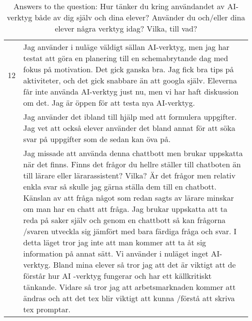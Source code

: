 \begin{table}[h]
{\begin{tabularx}{\textwidth}{@{}lX@{}}
12 & Jag använder i nuläge väldigt sällan AI-verktyg, men jag har testat att göra en planering till en schemabrytande dag med fokus på motivation. Det gick ganska bra. Jag fick bra tips på aktiviteter, och det gick snabbare än att googla själv. Eleverna får inte använda AI-verktyg just nu, men vi har haft diskussion om det. Jag är öppen för att testa nya AI-verktyg. \\ \hdashline
13 & Jag använder det ibland till hjälp med att formulera uppgifter. Jag vet att också elever använder det bland annat för att söka svar på uppgifter som de sedan kan öva på. \\ \hdashline
14 & Jag missade att använda denna chattbott men brukar uppskatta när det finns. Finns det frågor du hellre ställer till chatboten än till lärare eller lärarassistent? Vilka? Är det frågor men relativ enkla svar så skulle jag gärna ställa dem till en chatbott. Känslan av att fråga något som redan sagts av lärare minskar om man har en chatt att fråga. Jag brukar uppskatta att ta reda på saker själv och genom en chattbott så kan frågorna /svaren utveckla sig jämfört med bara färdiga fråga och svar. I detta läget tror jag inte att man kommer att ta åt sig information på annat sätt. Vi använder i nuläget inget AI-verktyg. Bland mina elever så tror jag att det är viktigt att de förstår hur AI -verktyg fungerar och har ett källkritiskt tänkande. Vidare så tror jag att arbetsmarknaden kommer att ändras och att det tex blir viktigt att kunna /förstå att skriva tex promptar. \\
\bottomrule
\end{tabularx}
}
\vspace{2mm}
\caption{Answers to the question: Hur tänker du kring användandet av AI-verktyg både av dig själv och dina elever? Använder du och/eller dina elever några verktyg idag? Vilka, till vad?}
\label{tab:appendix_typeform_table_question_AI_tools}
\end{table}
